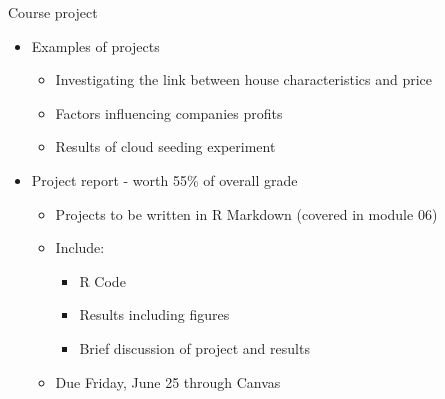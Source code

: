 \documentclass[aspectratio=169]{beamer}\usepackage[]{graphicx}\usepackage[]{color}
\begin{document}
\begin{frame}{Course project}
\begin{itemize}
  \item Examples of projects
  \begin{itemize}
  	\item Investigating the link between house characteristics and price
  	\item Factors influencing companies profits
  	\item Results of cloud seeding experiment
  \end{itemize}
  \item Project report - worth 55\% of overall grade
  \begin{itemize}
  	\item Projects to be written in R Markdown (covered in module 06)
  	\item Include:
  	\begin{itemize}
  		\item R Code
      \item Results including figures
      \item Brief discussion of project and results
  	\end{itemize}
  	\item Due Friday, June 25 through Canvas
  \end{itemize}
\end{itemize}
\end{frame}
\end{document}
